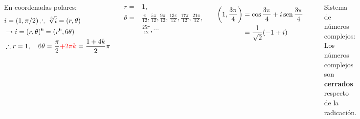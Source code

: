\documentclass[9pt, aspectratio=169]{beamer}
\begin{document}
\begin{frame}
	\begin{columns}[t]
		\cx
		En coordenadas polares:
		\begin{align*}
			 & i = (1, \pi/2) \therefore \; \sqrt[6]{i} = (r, \theta)                                              \\
			 & \rightarrow  i = (r, \theta)^6 = (r^6, 6 \theta)                                                    \\
			 & \therefore r = 1, \quad 6 \theta = \frac{\pi}{2} \textcolor{red}{+ 2 \pi k} = \frac{1 + 4 k}{2} \pi
		\end{align*}

		\begin{align*}
			r =      & 1,                                                                                                            \\
			\theta = & \frac{\pi}{12}, \frac{5 \pi}{12}, \frac{ 9 \pi}{12}, \frac{13 \pi}{12}, \frac{17 \pi}{12}, \frac{21 \pi}{12}, \\
			         & \frac{25 \pi}{12}, \cdots
		\end{align*}

		\begin{align*}
			\left( 1, \dfrac{3 \pi}{4} \right) & = \cos \dfrac{3 \pi}{4} + i \operatorname{sen} \dfrac{3 \pi}{4} \\
			                                   & = \frac{1}{\sqrt{2}} (-1 + i)
		\end{align*}


		\cx
		\begin{center}
			\includegraphics[scale=0.35]{figs/raices.pdf}
		\end{center}

		\begin{block}{Sistema de números complejos:}
			Los números complejos son \textbf{cerrados}
			respecto de la radicación.
		\end{block}
	\end{columns}
\end{frame}
\end{document}

